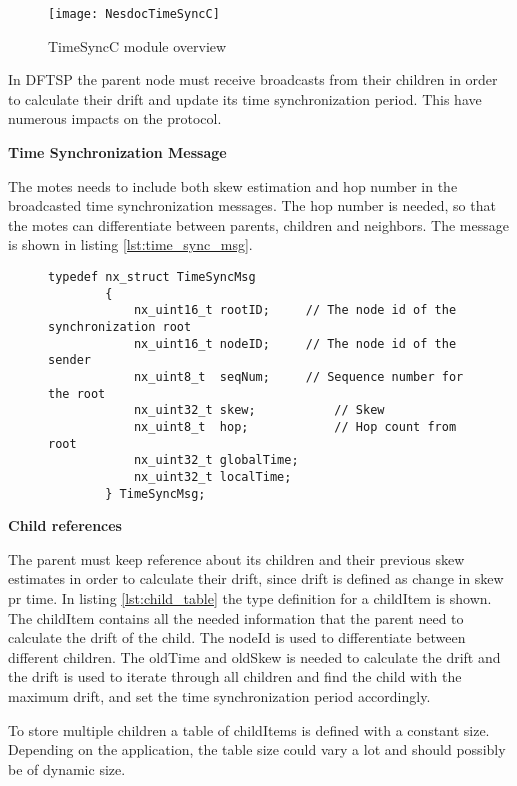 \documentclass[Main]{subfiles}
\begin{document}
				\begin{figure}[H]
					\centering
					\texttt{[image: NesdocTimeSyncC]}
					\caption{TimeSyncC module overview}
					\label{fig:nesdoc_time_sync_c}
				\end{figure}

				In DFTSP the parent node must receive broadcasts from their children in order to calculate their drift and update its time synchronization period.
				This have numerous impacts on the protocol.

				\textbf{Time Synchronization Message}
				
					The motes needs to include both skew estimation and hop number in the broadcasted time synchronization messages. 
					The hop number is needed, so that the motes can differentiate between parents, children and neighbors. 
					The message is shown in listing \ref{lst:time_sync_msg}.
					\begin{figure}[H]
						\begin{lstlisting}[caption=TimeSyncMsg, style=Code-C, label=lst:time_sync_msg]
		typedef nx_struct TimeSyncMsg
		{
			nx_uint16_t	rootID;		// The node id of the synchronization root
			nx_uint16_t	nodeID;		// The node id of the sender
			nx_uint8_t	seqNum;		// Sequence number for the root
			nx_uint32_t skew;			// Skew 
			nx_uint8_t  hop;			// Hop count from root
			nx_uint32_t	globalTime;
			nx_uint32_t localTime;
		} TimeSyncMsg;
						\end{lstlisting}
					\end{figure}
			
				
				\textbf{Child references}

					The parent must keep reference about its children and their previous skew estimates in order to calculate their drift, since drift is defined as change in skew pr time.
					In listing \ref{lst:child_table} the type definition for a childItem is shown. 
					The childItem contains all the needed information that the parent need to calculate the drift of the child.
					The nodeId is used to differentiate between different children.
					The oldTime and oldSkew is needed to calculate the drift and the drift is used to iterate through all children and find the child with the maximum drift, and set the time synchronization period accordingly.

					To store multiple children a table of childItems is defined with a constant size. Depending on the application, the table size could vary a lot and should possibly be of dynamic size.
\end{document}
